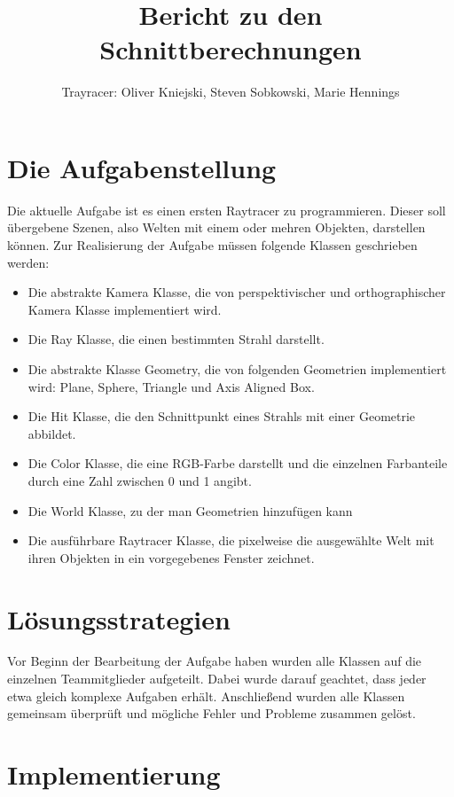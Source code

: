 \documentclass[a4paper,parskip=half,11pt]{scrartcl}
\author{Trayracer: Oliver Kniejski, Steven Sobkowski, Marie Hennings}
\title{Bericht zu den Schnittberechnungen}
\begin{document}
 
\maketitle

\section*{Die Aufgabenstellung}

Die aktuelle Aufgabe ist es einen ersten Raytracer zu programmieren.
Dieser soll übergebene Szenen, also Welten mit einem oder mehren Objekten, darstellen können.
Zur Realisierung der Aufgabe müssen folgende Klassen geschrieben werden:
\begin{itemize}
\item Die abstrakte Kamera Klasse, die von perspektivischer und orthographischer Kamera Klasse implementiert wird. 
\item Die Ray Klasse, die einen bestimmten Strahl darstellt.
\item Die abstrakte Klasse Geometry, die von folgenden Geometrien implementiert wird: Plane, Sphere, Triangle und Axis Aligned Box.
\item Die Hit Klasse, die den Schnittpunkt eines Strahls mit einer Geometrie abbildet.
\item Die Color Klasse, die eine RGB-Farbe darstellt und die einzelnen Farbanteile durch eine Zahl zwischen 0 und 1 angibt.
\item Die World Klasse, zu der man Geometrien hinzufügen kann
\item Die ausführbare Raytracer Klasse, die pixelweise die ausgewählte Welt mit ihren Objekten in ein vorgegebenes Fenster zeichnet.
\end{itemize}

\section*{Lösungsstrategien}

Vor Beginn der Bearbeitung der Aufgabe haben wurden alle Klassen auf die einzelnen Teammitglieder aufgeteilt.
Dabei wurde darauf geachtet, dass jeder etwa gleich komplexe Aufgaben erhält.
Anschließend wurden alle Klassen gemeinsam überprüft und mögliche Fehler und Probleme zusammen gelöst.

\section*{Implementierung}
\end{document}
